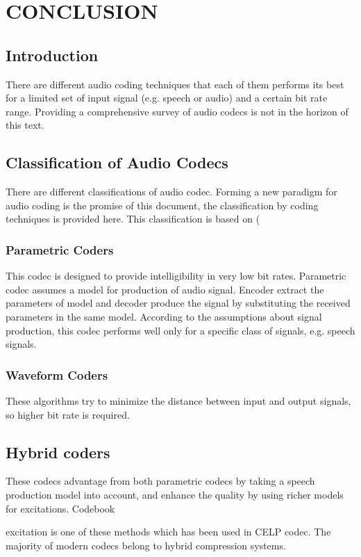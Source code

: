 \chapter{CONCLUSION}

\section{Introduction}
There are different audio coding techniques that each of them performs its best for a
limited set of input signal (e.g. speech or audio) and a certain bit rate range.
Providing a comprehensive survey of audio codecs is not in the horizon of this text.

\section{Classification of Audio Codecs}
There are different classifications of audio codec. Forming a new paradigm for audio coding
is the promise of this document, the classification by coding techniques is provided here.
This classification is based on (

\subsection{Parametric Coders}
This codec is designed to provide intelligibility in very low bit rates. Parametric codec assumes a model for production of audio signal. Encoder extract the parameters of model
and decoder produce the signal by substituting the received parameters in the same model.
According to the assumptions about signal production, this codec performs well only for
a specific class of signals, e.g. speech signals.

\subsection{Waveform Coders}
These algorithms try to minimize the distance between input and output signals, so higher
bit rate is required.

\section{Hybrid coders}
These codecs advantage from both parametric codecs by taking a speech production model
into account, and enhance the quality by using richer models for excitations. Codebook

excitation is one of these methods which has been used in CELP codec.
The majority of modern codecs belong to hybrid compression systems.


